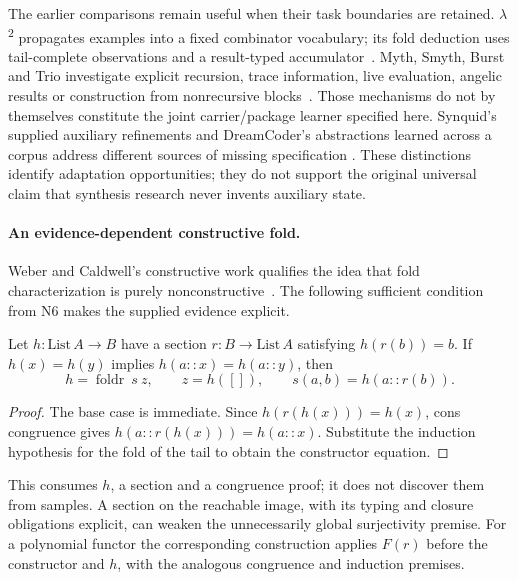 The earlier comparisons remain useful when their task boundaries are retained.
$\lambda$\textsuperscript{2} propagates examples into a fixed combinator vocabulary;
its fold deduction uses tail-complete observations and a result-typed
accumulator~\cite{lambda2}. Myth, Smyth, Burst and Trio investigate explicit
recursion, trace information, live evaluation, angelic results or construction
from nonrecursive blocks~\cite{myth,smyth,burst,trio}. Those mechanisms do not
by themselves constitute the joint carrier/package learner specified here.
Synquid's supplied auxiliary refinements and DreamCoder's abstractions learned
across a corpus address different sources of missing specification
\cite{synquid,dreamcoder}. These distinctions identify adaptation opportunities;
they do not support the original universal claim that synthesis research never
invents auxiliary state.

\paragraph{An evidence-dependent constructive fold.}
Weber and Caldwell's constructive work qualifies the idea that fold
characterization is purely nonconstructive~\cite{weber}. The following sufficient condition
from N6 makes the supplied evidence explicit.

\begin{proposition}
\label{prop:carrier-section-fold}
Let $h:\mathrm{List}\,A\to B$ have a section
$r:B\to\mathrm{List}\,A$ satisfying $h(r(b))=b$. If
$h(x)=h(y)$ implies $h(a::x)=h(a::y)$, then
\[
 h=\operatorname{foldr}\ s\ z,\qquad
 z=h([]),\qquad s(a,b)=h(a::r(b)).
\]
\end{proposition}
\begin{proof}
The base case is immediate. Since $h(r(h(x)))=h(x)$, cons congruence gives
$h(a::r(h(x)))=h(a::x)$. Substitute the induction hypothesis for the fold
of the tail to obtain the constructor equation.
\end{proof}

This consumes $h$, a section and a congruence proof; it does not discover them
from samples. A section on the reachable image, with its typing and closure
obligations explicit, can weaken the unnecessarily global surjectivity premise.
For a polynomial functor the corresponding construction applies $F(r)$ before
the constructor and $h$, with the analogous congruence and induction premises.

